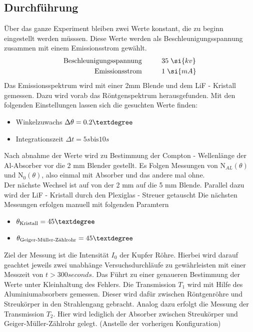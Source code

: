 \subsection{Durchführung}
Über das ganze Experiment bleiben zwei Werte konstant, die zu beginn eingestellt werden müsssen.
Diese Werte werden als Beschleunigungsspannung zusammen mit einem Emissionsstrom gewählt. 
\begin{align*}
\text{Beschleunigungsspannung} &  \hspace{1 cm} 35 \hspace{0.1 cm}\si{kv} \\
\text{Emissionsstrom} &  \hspace{1 cm}   1 \hspace{0.1 cm} \si{mA}\\
\end{align*}
Das Emissionsspektrum wird mit einer 2mm Blende und dem LiF - Kristall gemessen. 
Dazu wird vorab das Röntgenspektrum herausgefunden. Mit den folgenden Einstellungen lassen sich die gesuchten Werte finden:
\begin{itemize}
\item{Winkelzuwachs $\Delta \theta = 0.2 \textdegree$}
\item{Integrationszeit $\Delta t = 5 \si{s} \text{bis} 10 \si{s}$}
\end{itemize}
Nach abnahme der Werte wird zu Bestimmung der Compton - Wellenlänge der Al-Absorber vor die 2 mm Blender gestellt.
Es Folgen Messungen von $\text{N}_{AL}(\theta)$ und $\text{N}_{0}(\theta)$, also einmal mit Absorber und das andere mal ohne.
\\
\newline
Der nächste Wechsel ist auf von der 2 mm  auf die 5 mm Blende. Parallel dazu wird der LiF - Kristall durch den Plexiglas - Streuer getauscht
Die nächsten Messungen erfolgen manuell mit folgenden Paramtern
\begin{itemize}
\item{$\theta_{\text{Kristall}}  = 45 \textdegree$}
\item{$\theta_{\text{Geiger-Müller-Zählrohr}}  = 45 \textdegree$}
\end{itemize}
Ziel der Messung ist die Intensität $I_0$ der Kupfer Röhre.
Hierbei wird darauf geachtet jeweils zwei unabhänge Versuchsdurchläufe zu gewährleisten mit einer Messzeit von $t > \si{300}{seconds}$.
Das Führt zu einer genaueren Bestimmung der Werte unter Kleinhaltung des Fehlers.
Die Transmission $T_1$ wird mit Hilfe des Aluminiumabsorbers gemessen. Dieser wird dafür zwischen Röntgenröhre und Streukörper in den Strahlengang
gebracht. Analog dazu erfolgt die Messung der Transmission $T_2$. Hier wird lediglich der Absorber zwischen Streukörper und Geiger-Müller-Zählrohr gelegt. (Anstelle der vorherigen Konfiguration)